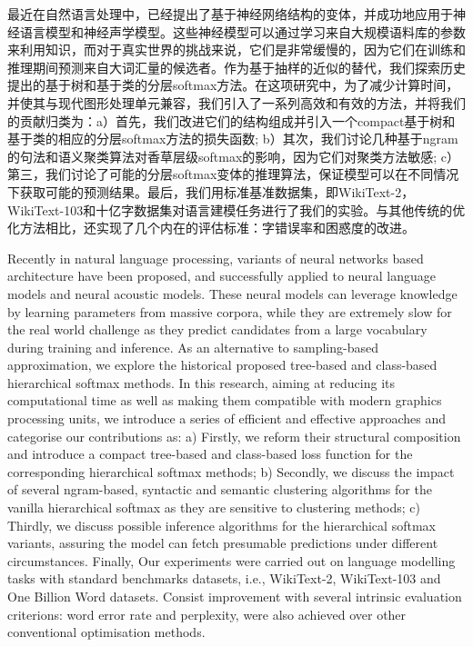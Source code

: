 \documentclass[master,openright,twoside,color]{buaathesis}
\begin{document}


\maketitle
\pagestyle{frontmatter}
\begin{cabstract}
最近在自然语言处理中，已经提出了基于神经网络结构的变体，并成功地应用于神经语言模型和神经声学模型。这些神经模型可以通过学习来自大规模语料库的参数来利用知识，而对于真实世界的挑战来说，它们是非常缓慢的，因为它们在训练和推理期间预测来自大词汇量的候选者。作为基于抽样的近似的替代，我们探索历史提出的基于树和基于类的分层softmax方法。在这项研究中，为了减少计算时间，并使其与现代图形处理单元兼容，我们引入了一系列高效和有效的方法，并将我们的贡献归类为：a）首先，我们改进它们的结构组成并引入一个compact基于树和基于类的相应的分层softmax方法的损失函数; b）其次，我们讨论几种基于ngram的句法和语义聚类算法对香草层级softmax的影响，因为它们对聚类方法敏感; c）第三，我们讨论了可能的分层softmax变体的推理算法，保证模型可以在不同情况下获取可能的预测结果。最后，我们用标准基准数据集，即WikiText-2，WikiText-103和十亿字数据集对语言建模任务进行了我们的实验。与其他传统的优化方法相比，还实现了几个内在的评估标准：字错误率和困惑度的改进。
\end{cabstract}

\begin{eabstract}
Recently in natural language processing, variants of neural networks based architecture have been proposed, and successfully applied to neural language models and neural acoustic models. These neural models can leverage knowledge by learning parameters from massive corpora, while they are extremely slow for the real world challenge as they predict candidates from a large vocabulary during training and inference. As an alternative to sampling-based approximation, we explore the historical proposed tree-based and class-based hierarchical softmax methods. In this research, aiming at reducing its computational time as well as making them compatible with modern graphics processing units, we introduce a series of efficient and effective approaches and categorise our contributions as: a) Firstly, we reform their structural composition and introduce a compact tree-based and class-based loss function for the corresponding hierarchical softmax methods; b) Secondly, we discuss the impact of several ngram-based, syntactic and semantic clustering algorithms for the vanilla hierarchical softmax as they are sensitive to clustering methods; c) Thirdly, we discuss possible inference algorithms for the hierarchical softmax variants, assuring the model can fetch presumable predictions under different circumstances. Finally, Our experiments were carried out on language modelling tasks with standard benchmarks datasets, i.e., WikiText-2, WikiText-103 and One Billion Word datasets. Consist improvement with several intrinsic evaluation criterions: word error rate and perplexity, were also achieved over other conventional optimisation methods.
\end{eabstract}
\tableofcontents
\listoffigures
\listoftables
%
\end{document}
